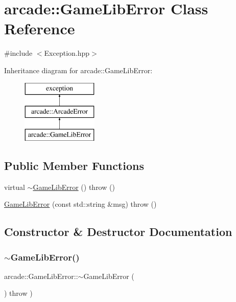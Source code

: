\hypertarget{classarcade_1_1_game_lib_error}{}\section{arcade\+:\+:Game\+Lib\+Error Class Reference}
\label{classarcade_1_1_game_lib_error}


{\ttfamily \#include $<$Exception.\+hpp$>$}

Inheritance diagram for arcade\+:\+:Game\+Lib\+Error\+:\begin{figure}[H]
\begin{center}
\leavevmode
\includegraphics[height=3.000000cm]{classarcade_1_1_game_lib_error}
\end{center}
\end{figure}
\subsection*{Public Member Functions}
\begin{DoxyCompactItemize}
\item 
virtual \hyperlink{classarcade_1_1_game_lib_error_a38ca420e0e8f68b129af7121809d15a1}{$\sim$\+Game\+Lib\+Error} ()  throw ()
\item 
\hyperlink{classarcade_1_1_game_lib_error_ae409cbfd8f358f41a45eac59a1843b8b}{Game\+Lib\+Error} (const std\+::string \&msg)  throw ()
\end{DoxyCompactItemize}


\subsection{Constructor \& Destructor Documentation}
\mbox{\label{classarcade_1_1_game_lib_error_a38ca420e0e8f68b129af7121809d15a1}} 
\subsubsection{\texorpdfstring{$\sim$\+Game\+Lib\+Error()}{~GameLibError()}}
{\footnotesize\ttfamily arcade\+::\+Game\+Lib\+Error\+::$\sim$\+Game\+Lib\+Error (\begin{DoxyParamCaption}{ }\end{DoxyParamCaption}) throw  ) \hspace{0.3cm}{\ttfamily [virtual]}}


